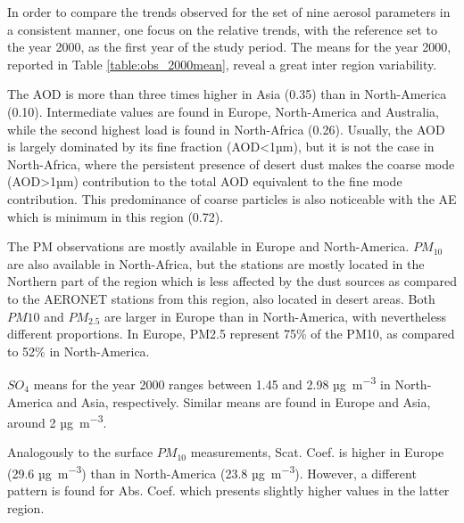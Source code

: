 \documentclass[journal abbreviation, manuscript]{copernicus}
\begin{document}
In order to compare the trends observed for the set of nine aerosol parameters in a consistent manner, one focus on the relative trends, with the reference set to the year 2000, as the first year of the study period. The means for the year 2000, reported in Table \ref{table:obs_2000mean}, reveal a great inter region variability. 

The AOD is more than three times higher in Asia (0.35) than in North-America (0.10). Intermediate values are found in Europe, North-America and Australia, while the second highest load is found in North-Africa (0.26). Usually, the AOD is largely dominated by its fine fraction (AOD<1µm), but it is not the case in North-Africa, where the persistent presence of desert dust makes the coarse mode (AOD>1µm) contribution to the total AOD equivalent to the fine mode contribution. This predominance of coarse particles is also noticeable with the AE which is minimum in this region (0.72). 

The PM observations are mostly available in Europe and North-America. $PM_{10}$ are also available in North-Africa, but the stations are mostly located in the Northern part of the region which is less affected by the dust sources as compared to the AERONET stations from this region, also located in desert areas. Both $PM{10}$ and $PM_{2.5}$ are larger in Europe than in North-America, with nevertheless different proportions. In Europe, PM2.5 represent 75\% of the PM10, as compared to 52\% in North-America.

$SO_{4}$ means for the year 2000 ranges between 1.45 and 2.98 \unit{µg.m^{-3}} in North-America and Asia, respectively. Similar means are found in Europe and Asia, around 2 \unit{µg.m^{-3}}.

Analogously to the surface $PM_{10}$ measurements, Scat. Coef. is higher in Europe (29.6 \unit{µg.m^{-3}}) than in North-America (23.8 \unit{µg.m^{-3}}). However, a different pattern is found for Abs. Coef. which presents slightly higher values in the latter region.
\end{document}
